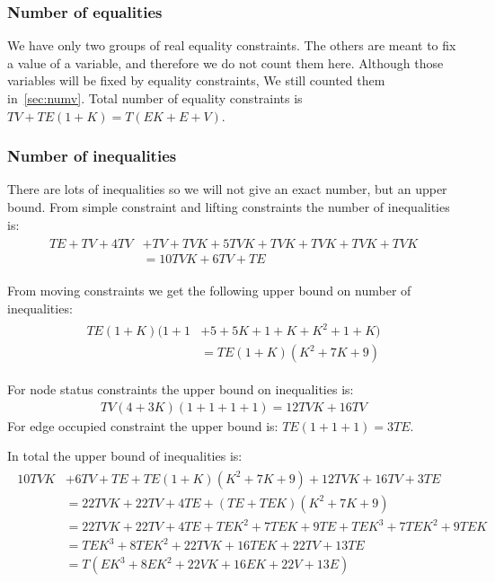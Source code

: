 \subsubsection{Number of equalities}
We have only two groups of real equality constraints. The others are meant to
fix a value of a variable, and therefore we do not count them here. Although
those variables will be fixed by equality constraints, We still counted them
in~\autoref{sec:numv}.
Total number of equality constraints is $TV + TE(1+K)= T(EK + E + V)$.
\subsubsection{Number of inequalities}
There are lots of inequalities so we will not give an exact number, but an
upper bound.
From simple constraint and lifting constraints the number of inequalities is:
\begin{align}
    \begin{split}
        TE + TV + 4TV &+ TV + TVK + 5TVK + TVK + TVK + TVK + TVK\\
        &=10TVK + 6TV + TE
    \end{split}
\end{align}

From moving constraints we get the following upper bound on number of
inequalities:
\begin{align}
    \begin{split}
        TE(1+K)(1 + 1 &+ 5 + 5K + 1 + K + K^2 + 1 + K)\\
        &=TE(1+K)(K^2 + 7K + 9)
    \end{split}
\end{align}

For node status constraints the upper bound on inequalities is:
\begin{align}
    TV(4+3K)(1 + 1 + 1 + 1) = 12TVK + 16TV
\end{align}
For edge occupied constraint the upper bound is: $TE(1+1+1) = 3TE$.

In total the upper bound of inequalities is:
\begin{align}
    \begin{split}
        10TVK &+ 6TV + TE + TE(1+K)(K^2 + 7K + 9) + 12TVK + 16TV + 3TE\\
        &= 22TVK + 22TV + 4TE + (TE + TEK)(K^2 + 7K + 9)\\
        &= 22TVK + 22TV + 4TE + TEK^2 + 7TEK + 9TE + TEK^3 + 7TEK^2 + 9TEK\\
        &= TEK^3 + 8TEK^2 + 22TVK + 16TEK + 22TV + 13TE\\
        &= T(EK^3 + 8EK^2 + 22VK + 16EK + 22V + 13E)
    \end{split}
\end{align}
